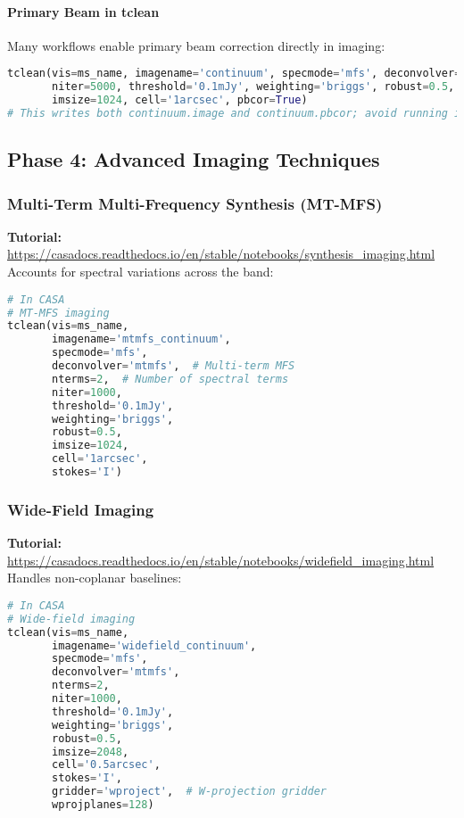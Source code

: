 \documentclass[11pt]{article}
\begin{document}
\paragraph{Primary Beam in tclean}
Many workflows enable primary beam correction directly in imaging:
\begin{lstlisting}[language=Python]
tclean(vis=ms_name, imagename='continuum', specmode='mfs', deconvolver='hogbom',
       niter=5000, threshold='0.1mJy', weighting='briggs', robust=0.5,
       imsize=1024, cell='1arcsec', pbcor=True)
# This writes both continuum.image and continuum.pbcor; avoid running impbcor again on pbcor output
\end{lstlisting}

\subsection{Phase 4: Advanced Imaging Techniques}

\subsubsection{Multi-Term Multi-Frequency Synthesis (MT-MFS)}
\textbf{Tutorial:} \url{https://casadocs.readthedocs.io/en/stable/notebooks/synthesis_imaging.html}
Accounts for spectral variations across the band:

\begin{lstlisting}[language=Python]
# In CASA
# MT-MFS imaging
tclean(vis=ms_name, 
       imagename='mtmfs_continuum',
       specmode='mfs',
       deconvolver='mtmfs',  # Multi-term MFS
       nterms=2,  # Number of spectral terms
       niter=1000,
       threshold='0.1mJy',
       weighting='briggs',
       robust=0.5,
       imsize=1024,
       cell='1arcsec',
       stokes='I')
\end{lstlisting}

\subsubsection{Wide-Field Imaging}
\textbf{Tutorial:} \url{https://casadocs.readthedocs.io/en/stable/notebooks/widefield\_imaging.html}
Handles non-coplanar baselines:

\begin{lstlisting}[language=Python]
# In CASA
# Wide-field imaging
tclean(vis=ms_name, 
       imagename='widefield_continuum',
       specmode='mfs',
       deconvolver='mtmfs',
       nterms=2,
       niter=1000,
       threshold='0.1mJy',
       weighting='briggs',
       robust=0.5,
       imsize=2048,
       cell='0.5arcsec',
       stokes='I',
       gridder='wproject',  # W-projection gridder
       wprojplanes=128)
\end{lstlisting}
\end{document}
